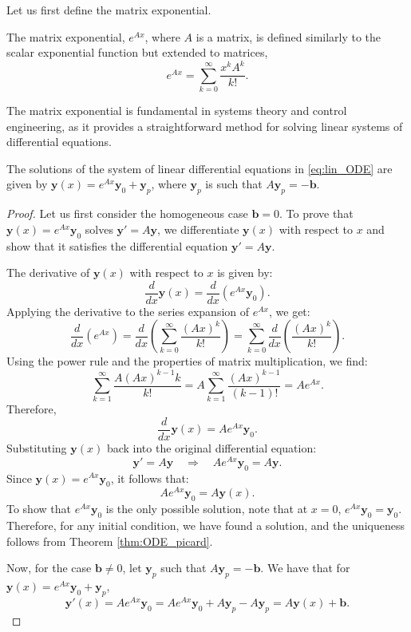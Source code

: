 Let us first define the matrix exponential.

\begin{definition}
The matrix exponential, $ e^{Ax} $, where $ A $ is a matrix, is defined similarly to the scalar exponential function but extended to matrices,    
\[
e^{Ax} = \sum_{k=0}^{\infty} \frac{x^k A^k}{k!}.
\]
\end{definition}
The matrix exponential is fundamental in systems theory and control engineering, as it provides a straightforward method for solving linear systems of differential equations.

\begin{proposition}
    The solutions of the system of linear differential equations in \eqref{eq:lin_ODE} are given by $ \mathbf{y}(x) = e^{Ax} \mathbf{y}_0 + \mathbf{y}_p$, where $\mathbf{y}_p$ is such that $A\mathbf{y}_p = -\mathbf{b}$.
\end{proposition}

\begin{proof}
    Let us first consider the homogeneous case $ \mathbf{b} = 0 $. To prove that $ \mathbf{y}(x) = e^{Ax} \mathbf{y}_0 $ solves $ \mathbf{y}' = A \mathbf{y} $, we differentiate $ \mathbf{y}(x) $ with respect to $ x $ and show that it satisfies the differential equation $\mathbf{y}' = A \mathbf{y}$.

    The derivative of $ \mathbf{y}(x) $ with respect to $ x $ is given by:
   \[
   \frac{d}{dx} \mathbf{y}(x) = \frac{d}{dx} \left(e^{Ax} \mathbf{y}_0\right).
   \]
   Applying the derivative to the series expansion of $ e^{Ax} $, we get:
   \[
   \frac{d}{dx} \left(e^{Ax}\right) = \frac{d}{dx} \left( \sum_{k=0}^{\infty} \frac{(Ax)^k}{k!} \right) = \sum_{k=0}^{\infty} \frac{d}{dx} \left( \frac{(Ax)^k}{k!} \right).
   \]
   Using the power rule and the properties of matrix multiplication, we find:
   \[
   \sum_{k=1}^{\infty} \frac{A (Ax)^{k-1} k}{k!} = A \sum_{k=1}^{\infty} \frac{(Ax)^{k-1}}{(k-1)!} = A e^{Ax}.
   \]
   Therefore,
   \[
   \frac{d}{dx} \mathbf{y}(x) = A e^{Ax} \mathbf{y}_0.
   \]
Substituting $ \mathbf{y}(x) $ back into the original differential equation:
   \[
   \mathbf{y}' = A \mathbf{y} \quad \Rightarrow \quad A e^{Ax} \mathbf{y}_0 = A \mathbf{y}.
   \]
   Since $ \mathbf{y}(x) = e^{Ax} \mathbf{y}_0 $, it follows that:
   \[
   A e^{Ax} \mathbf{y}_0 = A \mathbf{y}(x).
   \]
To show that $e^{Ax} \mathbf{y}_0$ is the only possible solution, note that at $x=0$, $e^{Ax} \mathbf{y}_0 = \mathbf{y}_0$. Therefore, for any initial condition, we have found a solution, and the uniqueness follows from Theorem \ref{thm:ODE_picard}.

Now, for the case $\mathbf{b} \neq 0 $, let $\mathbf{y}_p$ such that $A \mathbf{y}_p = -\mathbf{b}$. We have that for $ \mathbf{y}(x) = e^{Ax} \mathbf{y}_0 + \mathbf{y}_p$, 
\begin{equation*}
\mathbf{y}'(x) = A e^{Ax} \mathbf{y}_0 = A e^{Ax} \mathbf{y}_0 + A\mathbf{y}_p - A\mathbf{y}_p = A \mathbf{y}(x) + \mathbf{b}.
\end{equation*}
\end{proof}


